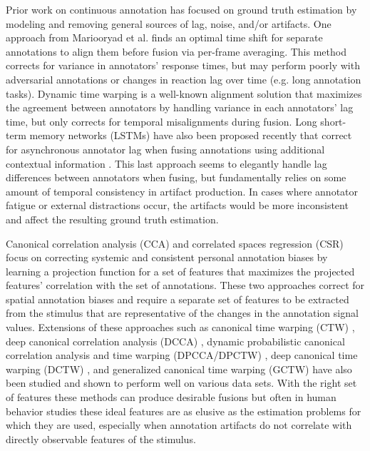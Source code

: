 \documentclass[10pt,letterpaper]{article}
\begin{document}
Prior work on continuous annotation has focused on ground truth estimation by modeling and removing general sources of lag, noise, and/or artifacts.  One approach from Mariooryad et al. \cite{Mariooryad2015} finds an optimal time shift for separate annotations to align them before fusion via per-frame averaging.  This method corrects for variance in annotators' response times, but may perform poorly with adversarial annotations or changes in reaction lag over time (e.g. long annotation tasks).  Dynamic time warping \cite{DTW2007} is a well-known alignment solution that maximizes the agreement between annotators by handling variance in each annotators' lag time, but only corrects for temporal misalignments during fusion.  Long short-term memory networks (LSTMs) have also been proposed recently that correct for asynchronous annotator lag when fusing annotations using additional contextual information \cite{Ringeval2015}.  This last approach seems to elegantly handle lag differences between annotators when fusing, but fundamentally relies on some amount of temporal consistency in artifact production.  In cases where annotator fatigue or external distractions occur, the artifacts would be more inconsistent and affect the resulting ground truth estimation.

Canonical correlation analysis (CCA) \cite{CCA1936} and correlated spaces regression (CSR) \cite{nicolaou2013correlated} focus on correcting systemic and consistent personal annotation biases by learning a projection function for a set of features that maximizes the projected features' correlation with the set of annotations.  These two approaches correct for spatial annotation biases and require a separate set of features to be extracted from the stimulus that are representative of the changes in the annotation signal values.  Extensions of these approaches such as canonical time warping (CTW) \cite{CTW2009}, deep canonical correlation analysis (DCCA) \cite{andrew2013deep}, dynamic probabilistic canonical correlation analysis and time warping (DPCCA/DPCTW) \cite{nicolaou2014dynamic}, deep canonical time warping (DCTW) \cite{trigeorgis2016deep}, and generalized canonical time warping (GCTW) \cite{Zhou2016} have also been studied and shown to perform well on various data sets.  With the right set of features these methods can produce desirable fusions but often in human behavior studies these ideal features are as elusive as the estimation problems for which they are used, especially when annotation artifacts do not correlate with directly observable features of the stimulus.
\end{document}
